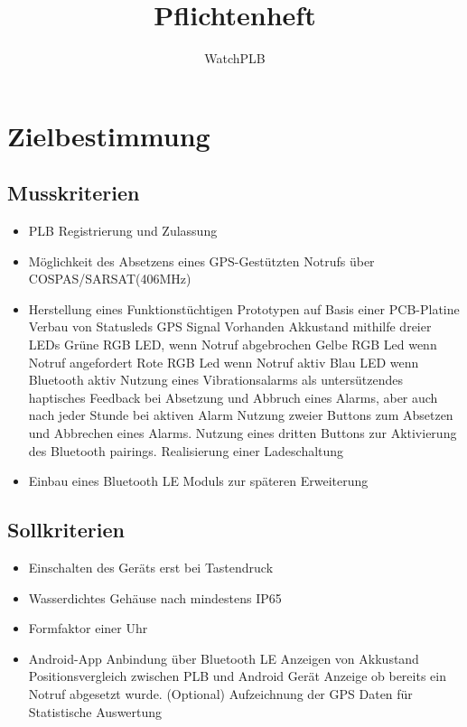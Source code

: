 \documentclass[a4paper]{scrreprt}
\begin{document}
 
\title{Pflichtenheft}
\author{WatchPLB}
\maketitle
 
\begin{abstract}
\end{abstract}
 
\tableofcontents
 
\chapter{Zielbestimmung}
 
\section{Musskriterien}
\begin{itemize}
	\item PLB Registrierung und Zulassung
	\item Möglichkeit des Absetzens eines GPS-Gestützten Notrufs über COSPAS/SARSAT(406MHz)
	\item Herstellung eines Funktionstüchtigen Prototypen auf Basis einer PCB-Platine
	\subitem Verbau von Statusleds
	\subsubitem GPS Signal Vorhanden
	\subsubitem Akkustand mithilfe dreier LEDs
	\subsubitem Grüne RGB LED, wenn Notruf abgebrochen
	\subsubitem Gelbe RGB Led wenn Notruf angefordert
	\subsubitem Rote RGB Led wenn Notruf aktiv
	\subsubitem Blau LED wenn Bluetooth aktiv
	\subitem Nutzung eines Vibrationsalarms als untersützendes haptisches Feedback bei Absetzung und Abbruch eines Alarms, aber auch nach jeder Stunde bei aktiven Alarm
	\subitem Nutzung zweier Buttons zum Absetzen und Abbrechen eines Alarms.
	\subitem Nutzung eines dritten Buttons zur Aktivierung des Bluetooth pairings.
	\subitem Realisierung einer Ladeschaltung
	\item Einbau eines Bluetooth LE Moduls zur späteren Erweiterung
\end{itemize}

 
\section{Sollkriterien}
\begin{itemize}
	\item Einschalten des Geräts erst bei Tastendruck
	\item Wasserdichtes Gehäuse nach mindestens IP65
	\item Formfaktor einer Uhr
	\item Android-App
		\subitem Anbindung über Bluetooth LE
		\subitem Anzeigen von Akkustand
		\subitem Positionsvergleich zwischen PLB und Android Gerät
		\subitem Anzeige ob bereits ein Notruf abgesetzt wurde.
		\subitem (Optional) Aufzeichnung der GPS Daten für Statistische Auswertung
\end{itemize}
 
\end{document}
